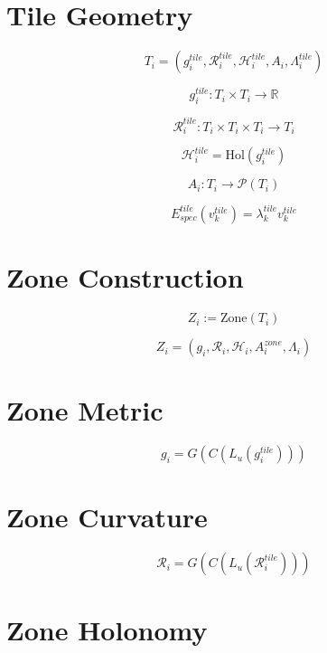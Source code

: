 
\section*{Tile Geometry}

\[
T_i = (g_i^{tile}, \mathcal{R}_i^{tile}, \mathcal{H}_i^{tile}, A_i, \Lambda_i^{tile})
\]

\[
g_i^{tile} : T_i \times T_i \to \mathbb{R}
\]

\[
\mathcal{R}_i^{tile} : T_i \times T_i \times T_i \to T_i
\]

\[
\mathcal{H}_i^{tile} = \mathrm{Hol}(g_i^{tile})
\]

\[
A_i : T_i \to \mathcal{P}(T_i)
\]

\[
E_{spec}^{tile}(v_k^{tile}) = \lambda_k^{tile} v_k^{tile}
\]


\section*{Zone Construction}

\[
Z_i := \mathrm{Zone}(T_i)
\]

\[
Z_i = (g_i, \mathcal{R}_i, \mathcal{H}_i, A_i^{zone}, \Lambda_i)
\]


\section*{Zone Metric}

\[
g_i = G(C(L_u(g_i^{tile})))
\]


\section*{Zone Curvature}

\[
\mathcal{R}_i = G(C(L_u(\mathcal{R}_i^{tile})))
\]


\section*{Zone Holonomy}

